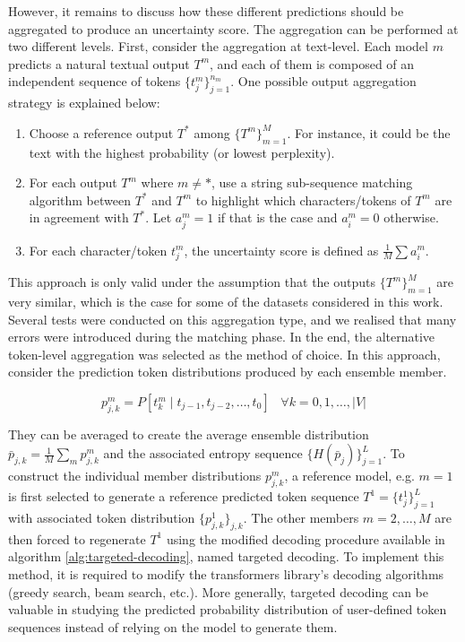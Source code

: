 However, it remains to discuss how these different predictions should be aggregated to produce an uncertainty score. The aggregation can be performed at two different levels. First, consider the aggregation at text-level. Each model $m$ predicts a natural textual output $T^m$, and each of them is composed of an independent sequence of tokens $\{t_j^m\}_{j=1}^{n_m}$. One possible output aggregation strategy is explained below:
    \begin{enumerate}
        \item Choose a reference output $T^*$ among $\{T^m\}_{m=1}^M$. For instance, it could be the text with the highest probability (or lowest perplexity).
        \item For each output $T^m$ where $m \not= *$, use a string sub-sequence matching algorithm between $T^*$ and $T^m$ to highlight which characters/tokens of $T^m$ are in agreement with $T^*$. Let $a_j^m = 1$ if that is the case and $a_i^m = 0$ otherwise.
        \item For each character/token $t_j^m$, the uncertainty score is defined as $\frac{1}{M} \sum a_i^m$.
    \end{enumerate}
This approach is only valid under the assumption that the outputs $\{T^m\}_{m=1}^M$ are very similar, which is the case for some of the datasets considered in this work. Several tests were conducted on this aggregation type, and we realised that many errors were introduced during the matching phase. In the end, the alternative token-level aggregation was selected as the method of choice. In this approach, consider the prediction token distributions produced by each ensemble member.

$$
p_{j,k}^m = P[t_k^m \mid t_{j-1}, t_{j-2}, \ldots, t_{0}] \;\;\; \forall k=0,1,\ldots, |V|
$$

They can be averaged to create the average ensemble distribution $\bar{p}_{j,k} = \frac{1}{M} \sum_m p_{j,k}^m$
and the associated entropy sequence $\{H(\bar{p}_{j}) \}_{j=1}^L$. To construct the individual member distributions $p_{j,k}^m$, a reference model, e.g. $m=1$ is first selected to generate a reference predicted token sequence $T^1 = \{t_{j}^1\}_{j=1}^L$ with associated token distribution $\{p_{j,k}^1\}_{j,k}$. The other members $m=2, \ldots, M$ are then forced to regenerate $T^1$ using the modified decoding procedure available in algorithm \ref{alg:targeted-decoding}, named targeted decoding. To implement this method, it is required to modify the transformers library's decoding algorithms (greedy search, beam search, etc.). More generally, targeted decoding can be valuable in studying the predicted probability distribution of user-defined token sequences instead of relying on the model to generate them. 

